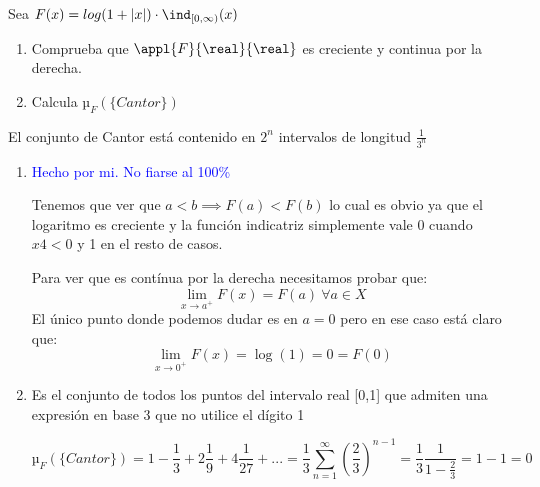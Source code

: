 \begin{problem}
Sea $F(x)=log(1 + |x|)\cdot \ind_{[0, \infty)}(x)$
\begin{enumerate}
\item Comprueba que $\appl{F}{\real}{\real}$ es creciente y continua por la derecha.
\item Calcula $µ_F(\{Cantor\})$
\end{enumerate}
\obs El conjunto de Cantor está contenido en $2^n$ intervalos de longitud $\frac{1}{3^n}$
\solution

\begin{enumerate}
\item \textcolor{blue}{Hecho por mi. No fiarse al 100\%}

Tenemos que ver que $a<b \implies F(a) < F(b)$ lo cual es obvio ya que el logaritmo es creciente y la función indicatriz simplemente vale 0 cuando $x4 < 0$ y 1 en el resto de casos.

Para ver que es contínua por la derecha necesitamos probar que:
\[\lim_{x \to a^+}F(x) = F(a) \ \forall a \in X\]
El único punto donde podemos dudar es en $a=0$ pero en ese caso está claro que:
\[\lim_{x \to 0^+}F(x) = \log(1) = 0 = F(0)\]

\item
\begin{defn}
Es el conjunto de todos los puntos del intervalo real [0,1] que admiten una expresión en base 3 que no utilice el dígito 1
\end{defn}

\[µ_F(\{Cantor\}) = 1 - \frac{1}{3}+2\frac{1}{9}+4\frac{1}{27}+... = \frac{1}{3} \sum_{n=1}^{\infty}\left(\frac{2}{3}\right)^{n-1} = \frac{1}{3} \frac{1}{1-\frac{2}{3}} = 1-1 = 0\]

\end{enumerate}
\end{problem}

